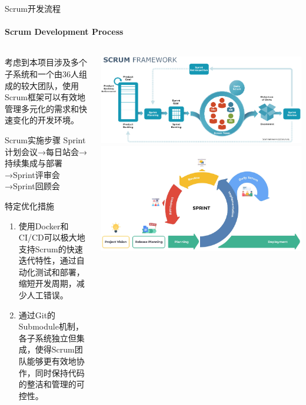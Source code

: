 \documentclass{beamer}
\begin{document}
\begin{frame}[fragile]{Scrum开发流程}
\framesubtitle{Scrum Development Process}
\begin{columns}
\begin{column}{0.5\textwidth}
\footnotesize 考虑到本项目涉及多个子系统和一个由36人组成的较大团队，使用Scrum框架可以有效地管理多元化的需求和快速变化的开发环境。
\begin{block}{Scrum实施步骤}
\footnotesize Sprint计划会议→每日站会→持续集成与部署→Sprint评审会→Sprint回顾会
\end{block}
\begin{block}{特定优化措施}
\begin{enumerate}
\item \footnotesize 使用Docker和CI/CD可以极大地支持Scrum的快速迭代特性，通过自动化测试和部署，缩短开发周期，减少人工错误。
\item \footnotesize 通过Git的Submodule机制，各子系统独立但集成，使得Scrum团队能够更有效地协作，同时保持代码的整洁和管理的可控性。
\end{enumerate}
\end{block}
\end{column}
\begin{column}{0.5\textwidth}
\includegraphics[width=\textwidth]
{figures/scrum_framework}
\includegraphics[width=\textwidth]
{figures/scrum_sprint}
\end{column}
\end{columns}
\end{frame}
\end{document}

